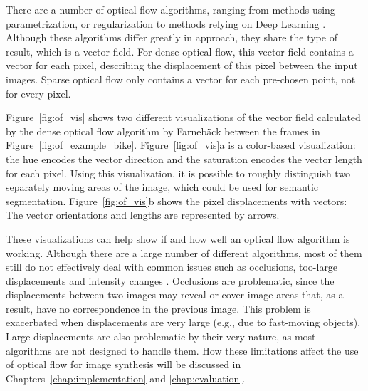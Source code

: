 There are a number of optical flow algorithms, ranging from methods using parametrization, or regularization \cite{of-survey} to methods relying on Deep Learning \cite{of-deep}. Although these algorithms differ greatly in approach, they share the type of result, which is a vector field. For dense optical flow, this vector field contains a vector for each pixel, describing the displacement of this pixel between the input images. Sparse optical flow only contains a vector for each pre-chosen point, not for every pixel.

Figure~\ref{fig:of_vis} shows two different visualizations of the vector field calculated by the dense optical flow algorithm by Farneb\"ack \cite{farneback} between the frames in Figure~\ref{fig:of_example_bike}. Figure~\ref{fig:of_vis}a is a color-based visualization: the hue encodes the vector direction and the saturation encodes the vector length for each pixel. Using this visualization, it is possible to roughly distinguish two separately moving areas of the image, which could be used for semantic segmentation. Figure~\ref{fig:of_vis}b shows the pixel displacements with vectors: The vector orientations and lengths are represented by arrows.

These visualizations can help show if and how well an optical flow algorithm is working. Although there are a large number of different algorithms, most of them still do not effectively deal with common issues such as occlusions, too-large displacements and intensity changes \cite{of-survey}. Occlusions are problematic, since the displacements between two images may reveal or cover image areas that, as a result, have no correspondence in the previous image. This problem is exacerbated when displacements are very large (e.g., due to fast-moving objects). Large displacements are also problematic by their very nature, as most algorithms are not designed to handle them. How these limitations affect the use of optical flow for image synthesis will be discussed in Chapters~\ref{chap:implementation} and \ref{chap:evaluation}.

